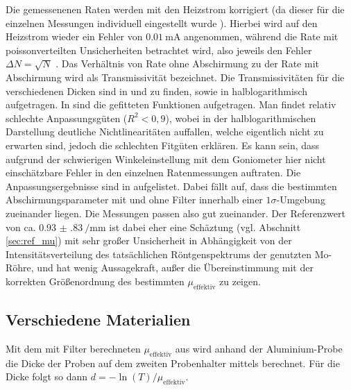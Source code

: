 Die gemessenenen Raten werden mit den Heizstrom korrigiert (da dieser für die einzelnen Messungen individuell eingestellt wurde \cite[6]{529va}). Hierbei wird auf den Heizstrom wieder ein Fehler von $\SI{0.01}{\milli\ampere}$ angenommen, während die Rate mit poissonverteilten Unsicherheiten betrachtet wird, also jeweils den Fehler $\Delta N = \sqrt{N}$ \cite[788]{kolanoskiwermerdetektoren}. Das Verhältnis von Rate ohne Abschirmung zu der Rate mit Abschirmung wird als Transmissivität bezeichnet.
Die Transmissivitäten für die verschiedenen Dicken sind in  und  zu finden, sowie in  halblogarithmisch aufgetragen. In  sind die gefitteten Funktionen aufgetragen.
Man findet relativ schlechte Anpassungsgüten ($R^2<0,9$), wobei in der halblogarithmischen Darstellung deutliche Nichtlinearitäten auffallen, welche eigentlich nicht zu erwarten sind, jedoch die schlechten Fitgüten erklären. Es kann sein, dass aufgrund der schwierigen Winkeleinstellung mit dem Goniometer hier nicht einschätzbare Fehler in den einzelnen Ratenmessungen auftraten.
Die Anpassungsergebnisse sind in  aufgelistet. Dabei fällt auf, dass die bestimmten Abschirmungsparameter mit und ohne Filter innerhalb einer $1\sigma$-Umgebung zueinander liegen. Die Messungen passen also gut zueinander. Der Referenzwert von ca. $\SI{0.93(83)}{\per\milli\meter}$ ist dabei eher eine Schäztung (vgl. Abschnitt \ref{sec:ref_mu}) mit sehr großer Unsicherheit in Abhängigkeit von der Intensitätsverteilung des tatsächlichen Röntgenspektrums der genutzten Mo-Röhre, und hat wenig Aussagekraft, außer die Übereinstimmung mit der korrekten Größenordnung des bestimmten $\mu_\text{effektiv}$ zu zeigen.





\subsection{Verschiedene Materialien}
Mit dem mit Filter berechneten $\mu_\text{effektiv}$ aus  wird anhand der Aluminium-Probe die Dicke der Proben auf dem zweiten Probenhalter mittels  berechnet. Für die Dicke folgt so dann $d = - \ln(T) / \mu_\text{effektiv}$.

